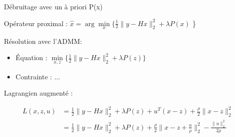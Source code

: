 

\begin{frame}{Débruitage avec un à priori P(x)}

Opérateur proximal : $\hat{x} = \arg\min\limits_{x} \{ \frac{1}{2} \lVert y - Hx \rVert_{2}^{2} + \lambda P(x)$ \} \\

\vspace{5mm}

Résolution avec l'ADMM:
\begin{itemize}
    \item Équation : $\min\limits_{x, z} \{ \frac{1}{2} \lVert y - Hx \rVert_{2}^{2} + \lambda P(z) \}$
    \item Contrainte : ...
\end{itemize}

\vspace{5mm}

Lagrangien augmenté :

\begin{align*}
L(x, z, u) 
&= \frac{1}{2} \lVert y - Hx \rVert_{2}^{2} + \lambda P(z) +
u^{T}(x-z) + \frac{\rho}{2} \lVert x-z \rVert_{2}^{2} \\
&= \frac{1}{2} \lVert y - Hx \rVert_{2}^{2} + \lambda P(z) +
\frac{\rho}{2} \lVert x-z+\frac{u}{\rho} \rVert_{2}^{2} - \frac{\lVert u \rVert_{2}^{2}}{2\rho}    
\end{align*}

\end{frame}

